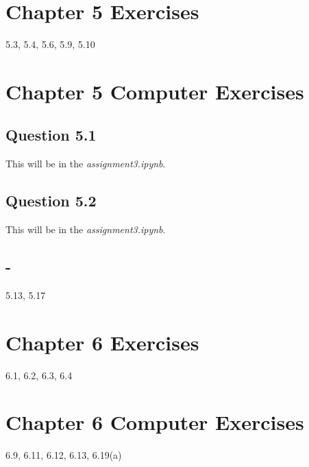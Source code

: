\documentclass[12pt,a4paper]{report}
\author{Malcolm Watt}
\begin{document}
\section*{Chapter 5 Exercises}
5.3, 5.4, 5.6, 5.9, 5.10

\section*{Chapter 5 Computer Exercises}

\subsection*{Question 5.1}
This will be in the \textit{assignment3.ipynb}.

\subsection*{Question 5.2}
This will be in the \textit{assignment3.ipynb}.

\subsection*{-}
5.13, 5.17

\section*{Chapter 6 Exercises}
6.1, 6.2, 6.3, 6.4

\section*{Chapter 6 Computer Exercises}
6.9, 6.11, 6.12, 6.13, 6.19(a)
\end{document}
